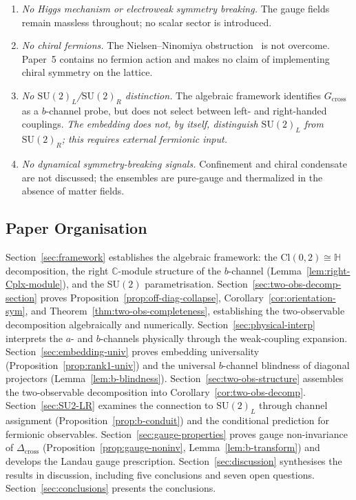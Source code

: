 \documentclass[12pt]{article}
\numberwithin{equation}{section}
\theoremstyle{plain}
\theoremstyle{definition}
\theoremstyle{remark}
\newcommand{\cl}{\mathrm{Cl}}              %
\newcommand{\su}{\mathrm{SU}}              %
\newcommand{\Cplx}{\mathbb{C}}             %
\newcommand{\HH}{\mathbb{H}}               %
\newcommand{\Gcross}{G_{\mathrm{cross}}}   %
\newcommand{\Dcross}{\Delta_{\mathrm{cross}}}  %
\begin{document}
	\begin{enumerate}
		\item
		\emph{No Higgs mechanism or electroweak symmetry breaking.}
		The gauge fields remain massless throughout; no scalar sector
		is introduced.
		
		\item
		\emph{No chiral fermions.}  The Nielsen--Ninomiya
		obstruction~\cite{NielsenNinomiya1981a,NielsenNinomiya1981b}
		is not overcome.  Paper~5 contains no fermion action and makes
		no claim of implementing chiral symmetry on the lattice.
		
		\item
		\emph{No $\su(2)_L$/$\su(2)_R$ distinction.}  The algebraic
		framework identifies $\Gcross$ as a $b$-channel probe, but does
		not select between left- and right-handed couplings.
		\emph{The embedding does not, by itself, distinguish
			$\su(2)_L$ from $\su(2)_R$; this requires external fermionic
			input.}
		
		\item
		\emph{No dynamical symmetry-breaking signals.}  Confinement and
		chiral condensate are not discussed; the ensembles are
		pure-gauge and thermalized in the absence of matter fields.
	\end{enumerate}
	
	\subsection{Paper Organisation}
	\label{sec:intro-organization}
	
	Section~\ref{sec:framework} establishes the algebraic framework:
	the $\cl(0,2)\cong\HH$ decomposition, the right $\Cplx$-module
	structure of the $b$-channel (Lemma~\ref{lem:right-Cplx-module}),
	and the $\su(2)$ parametrisation.
	Section~\ref{sec:two-obs-decomp-section} proves
	Proposition~\ref{prop:off-diag-collapse},
	Corollary~\ref{cor:orientation-sym}, and
	Theorem~\ref{thm:two-obs-completeness}, establishing the
	two-observable decomposition algebraically and numerically.
	Section~\ref{sec:physical-interp} interprets the $a$- and
	$b$-channels physically through the weak-coupling expansion.
	Section~\ref{sec:embedding-univ} proves embedding universality
	(Proposition~\ref{prop:rank1-univ}) and the universal $b$-channel
	blindness of diagonal projectors (Lemma~\ref{lem:b-blindness}).
	Section~\ref{sec:two-obs-structure} assembles the two-observable
	decomposition into Corollary~\ref{cor:two-obs-decomp}.
	Section~\ref{sec:SU2-LR} examines the connection to $\su(2)_L$
	through channel assignment (Proposition~\ref{prop:b-conduit}) and
	the conditional prediction for fermionic observables.
	Section~\ref{sec:gauge-properties} proves gauge non-invariance of
	$\Dcross$ (Proposition~\ref{prop:gauge-noninv},
	Lemma~\ref{lem:b-transform}) and develops the Landau gauge
	prescription.
	Section~\ref{sec:discussion} synthesises the results in discussion,
	including five conclusions and seven open questions.
	Section~\ref{sec:conclusions} presents the conclusions.
	
\end{document}
